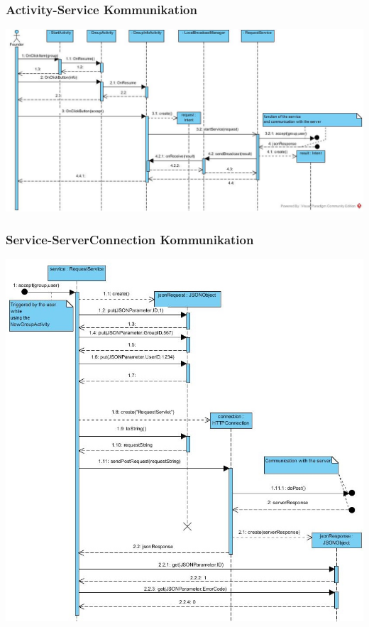\subsubsection{Activity-Service Kommunikation}

\includegraphics[width=1.1\textwidth]{Activity_Service.jpg}
	

\subsubsection{Service-ServerConnection Kommunikation}

\includegraphics[width=1.1\textwidth]{Service_ServerConnection.jpg}

